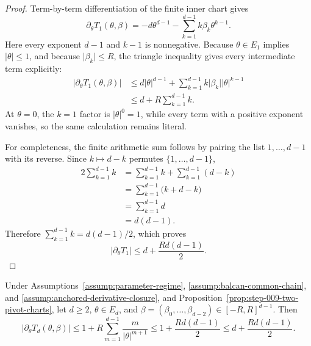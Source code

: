 \begin{proof}
Term-by-term differentiation of the finite inner chart gives
\begin{equation}
\label{eq:appendix-display-281}
\partial_\theta T_1(\theta,\beta)
=-d\theta^{d-1}-\sum_{k=1}^{d-1}k\beta_k\theta^{k-1}.
\end{equation}
Here every exponent \(d-1\) and \(k-1\) is nonnegative. Because \(\theta\in E_1\) implies \(\lvert\theta\rvert\leq1\), and because \(\lvert\beta_k\rvert\leq R\), the triangle inequality gives every intermediate term explicitly:
\begin{equation}
\label{eq:appendix-display-282}
\begin{aligned}
\lvert\partial_\theta T_1(\theta,\beta)\rvert
&\leq d\lvert\theta\rvert^{d-1}
  +\sum_{k=1}^{d-1}k\lvert\beta_k\rvert\lvert\theta\rvert^{k-1}\\
&\leq d
  +R\sum_{k=1}^{d-1}k.
\end{aligned}
\end{equation}
At \(\theta=0\), the \(k=1\) factor is \(\lvert\theta\rvert^0=1\), while every term with a positive exponent vanishes, so the same calculation remains literal.

For completeness, the finite arithmetic sum follows by pairing the list \(1,\ldots,d-1\) with its reverse. Since \(k\mapsto d-k\) permutes \(\{1,\ldots,d-1\}\),
\begin{equation}
\label{eq:appendix-display-283}
\begin{aligned}
2\sum_{k=1}^{d-1}k
&=\sum_{k=1}^{d-1}k+\sum_{k=1}^{d-1}(d-k)\\
&=\sum_{k=1}^{d-1}\bigl(k+d-k\bigr)\\
&=\sum_{k=1}^{d-1}d\\
&=d(d-1).
\end{aligned}
\end{equation}
Therefore \(\sum_{k=1}^{d-1}k=d(d-1)/2\), which proves
\begin{equation}
\label{eq:appendix-display-284}
\lvert\partial_\theta T_1\rvert
\leq d+\frac{Rd(d-1)}2.
\end{equation}
\end{proof}

\begin{lemma} \label{lem:step-009-outer-velocity}
Under Assumptions~\ref{assump:parameter-regime}, \ref{assump:balcan-common-chain}, and \ref{assump:anchored-derivative-closure}, and Proposition~\ref{prop:step-009-two-pivot-charts}, let \(d\geq2\), \(\theta\in E_d\), and \(\beta=(\beta_0,\ldots,\beta_{d-2})\in[-R,R]^{d-1}\). Then
\begin{equation}
\label{eq:appendix-display-285}
\lvert\partial_\theta T_d(\theta,\beta)\rvert
\leq1+R\sum_{m=1}^{d-1}\frac{m}{\lvert\theta\rvert^{m+1}}
\leq1+\frac{Rd(d-1)}2
\leq d+\frac{Rd(d-1)}2.
\end{equation}


\end{lemma}

